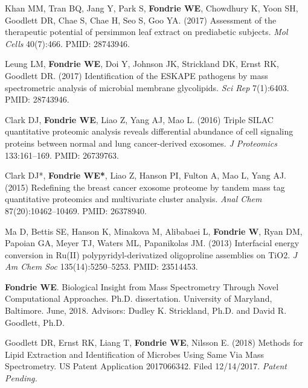 \documentclass[11pt]{article}
\newcommand{\mysection}[1]{\vspace{1ex {\bf \large \textrm{#1}} \quad
    \hrulefill}}
\begin{document}
\begin{etaremune}
  \item Khan MM, Tran BQ, Jang Y, Park S, {\bf Fondrie WE}, Chowdhury K, Yoon
    SH, Goodlett DR, Chae S, Chae H, Seo S, Goo YA. (2017) Assessment of the
    therapeutic potential of persimmon leaf extract on prediabetic subjects.
    {\it Mol Cells} 40(7):466. PMID: 28743946.
    
  \item Leung LM, {\bf Fondrie WE}, Doi Y, Johnson JK, Strickland DK, Ernst RK,
    Goodlett DR. (2017) Identification of the ESKAPE pathogens by mass
    spectrometric analysis of microbial membrane glycolipids. {\it Sci Rep}
    7(1):6403. PMID: 28743946. 

  \item Clark DJ, {\bf Fondrie WE}, Liao Z, Yang AJ, Mao L. (2016) Triple SILAC
    quantitative proteomic analysis reveals differential abundance of cell
    signaling proteins between normal and lung cancer-derived exosomes. {\it J
      Proteomics} 133:161--169. PMID: 26739763.

  \item Clark DJ*, {\bf Fondrie WE*}, Liao Z, Hanson PI, Fulton A, Mao L, Yang
    AJ. (2015) Redefining the breast cancer exosome proteome by tandem mass tag
    quantitative proteomics and multivariate cluster analysis. \textit{Anal
      Chem} 87(20):10462--10469. PMID: 26378940. 
    
  \item Ma D, Bettis SE, Hanson K, Minakova M, Alibabaei L, {\bf Fondrie W},
    Ryan DM, Papoian GA, Meyer TJ, Waters ML, Papanikolas JM. (2013) Interfacial
    energy conversion in Ru(II) polypyridyl-derivatized oligoproline assemblies
    on TiO2. \textit{J Am Chem Soc} 135(14):5250--5253. PMID: 23514453. 
\end{etaremune}

\mysection{Additional Publications}
\begin{etaremune}
  \item {\bf Fondrie WE}. Biological Insight from Mass Spectrometry Through
    Novel Computational Approaches. Ph.D. dissertation. University of Maryland,
    Baltimore. June, 2018. Advisors: Dudley K. Strickland, Ph.D. and David R.
    Goodlett, Ph.D.
\end{etaremune}

\mysection{Patents}
\begin{etaremune}
  \item Goodlett DR, Ernst RK, Liang T, {\bf Fondrie WE}, Nilsson E. (2018)
    Methods for Lipid Extraction and Identification of Microbes Using Same Via
    Mass Spectrometry. US Patent Application 2017066342. Filed 12/14/2017. {\it
      Patent Pending.}
\end{etaremune}
\end{document}
